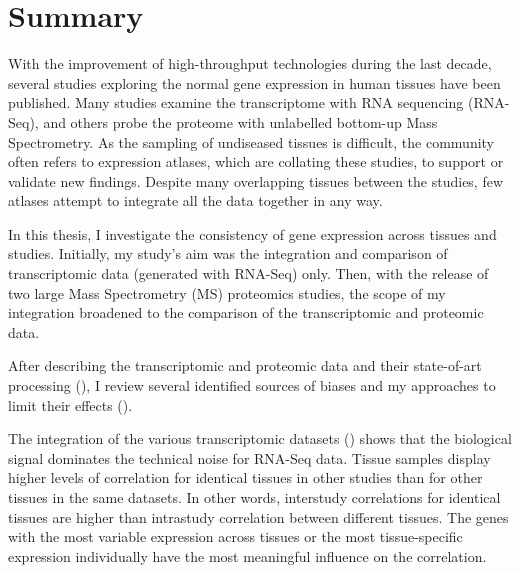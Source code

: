 \clearpage
\chapter*{Summary}\label{ch:summary}
\vspace{-1cm}
\begin{singlespace}
    {\small With the improvement of high-throughput technologies
    during the last decade,
    several studies exploring the normal gene expression in human tissues
    have been published.
    Many studies examine the transcriptome with RNA sequencing (RNA-Seq),
    and others probe the proteome with unlabelled bottom-up Mass Spectrometry.
    As the sampling of undiseased tissues is difficult,
    the community often refers to expression atlases,
    which are collating these studies,
    to support or validate new findings.
    Despite many overlapping tissues between the studies,
    few atlases attempt to integrate all the data together in any way.\mybr\

    In this thesis, I investigate the consistency of gene expression
    across tissues and studies.
    Initially, my study's aim was
    the integration and comparison of transcriptomic data
    (generated with RNA-Seq) only.
    Then, with the release of two large Mass Spectrometry (MS) proteomics studies,
    the scope of my integration broadened to
    the comparison of the transcriptomic and proteomic data.\mybr\

    After describing the transcriptomic and proteomic data
    and their state-of-art processing (),
    I review several identified sources of biases
    and my approaches to limit their effects ().\mybr\

    The integration of the various transcriptomic datasets ()
    shows that
    the biological signal dominates the technical noise for RNA-Seq data.
    Tissue samples display higher levels of correlation
    for identical tissues in other studies than
    for other tissues in the same datasets.
    In other words, interstudy correlations for identical tissues
    are higher than intrastudy correlation between different tissues.
    The genes with the most variable expression across tissues
    or the most tissue-specific expression individually have
    the most meaningful influence on the correlation.\mybr\

}
\end{singlespace}
